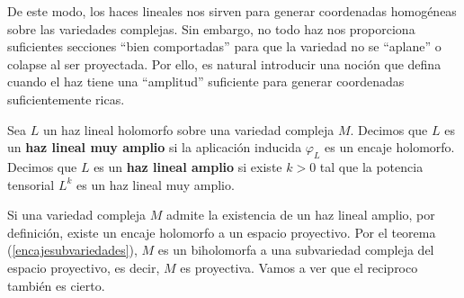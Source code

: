 	De este modo, los haces lineales nos sirven para generar coordenadas homogéneas sobre las variedades complejas. Sin embargo, no todo haz nos proporciona suficientes secciones \enquote{bien comportadas} para que la variedad no se \enquote{aplane} o colapse al ser proyectada. Por ello, es natural introducir una noción que defina cuando el haz tiene una \enquote{amplitud} suficiente para generar coordenadas suficientemente ricas.
	
	\begin{definition} 
		Sea $L$ un haz lineal holomorfo sobre una variedad compleja $M$. Decimos que $L$ es un \textbf{haz lineal muy amplio} si la aplicación inducida $\varphi_L$ es un encaje holomorfo.\\
		Decimos que $L$ es un \textbf{haz lineal amplio} si existe $k>0$ tal que la potencia tensorial $L^k$ es un haz lineal muy amplio.
	\end{definition}
	
	
	Si una variedad compleja $M$ admite la existencia de un haz lineal amplio, por definición, existe un encaje holomorfo a un espacio proyectivo. Por el teorema (\ref{encajesubvariedades}), $M$ es un biholomorfa a una subvariedad compleja del espacio proyectivo, es decir, $M$ es proyectiva. Vamos a ver que el reciproco también es cierto.

